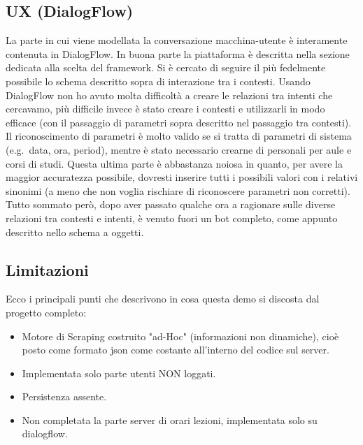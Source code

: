 \documentclass[]{article}
\begin{document}
\subsection{UX (DialogFlow)}
La parte in cui viene modellata la conversazione macchina-utente è interamente contenuta in DialogFlow. In buona parte la piattaforma è descritta nella sezione dedicata alla scelta del framework. Si è cercato di seguire il più fedelmente possibile lo schema descritto sopra di interazione tra i contesti. Usando DialogFlow non ho avuto molta difficoltà a creare le relazioni tra intenti che cercavamo, più difficile invece è stato creare i contesti e utilizzarli in modo efficace (con il passaggio di parametri sopra descritto nel passaggio tra contesti). Il riconoscimento di parametri è molto valido se si tratta di parametri di sistema (e.g.\ data, ora, period), mentre è stato necessario crearne di personali per aule e corsi di studi. Questa ultima parte è abbastanza noiosa in quanto, per avere la maggior accuratezza possibile, dovresti inserire tutti i possibili valori con i relativi sinonimi (a meno che non voglia rischiare di riconoscere parametri non corretti). Tutto sommato però, dopo aver passato qualche ora a ragionare sulle diverse relazioni tra contesti e intenti, è venuto fuori un bot completo, come appunto descritto nello schema a oggetti.  

\subsection{Limitazioni}
Ecco i principali punti che descrivono in cosa questa demo si discosta dal progetto completo:
\begin{itemize}
\item Motore di Scraping costruito "ad-Hoc" (informazioni non dinamiche), cioè posto come formato json come costante all'interno del codice sul server.
\item Implementata solo parte utenti NON loggati.
\item Persistenza assente.
\item  Non completata la parte server di orari lezioni, implementata solo su dialogflow.
\end{itemize}
\end{document}
